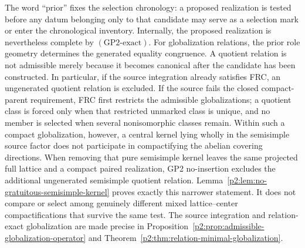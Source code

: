 \documentclass[12pt,a4paper]{article}
\begin{document}
\begin{mdframed}[style=postulatebox,nobreak=false]
\begin{postulate}
The word ``prior'' fixes the selection chronology: a proposed realization is
tested before any datum belonging only to that candidate may serve as a
selection mark or enter the chronological inventory.  Internally, the proposed
realization is nevertheless complete by \((\mathrm{GP2\text{-}exact})\).  For
globalization relations, the prior role geometry determines the generated
equality congruence.  A quotient
relation is not admissible merely because it becomes canonical after the
candidate has been constructed.  In particular, if the source integration
already satisfies FRC, an ungenerated quotient relation is excluded.  If the
source fails the closed compact-parent requirement, FRC first restricts the
admissible globalizations; a quotient class is forced only when that
restricted unmarked class is unique, and no member is selected when several
nonisomorphic classes remain.  Within such a compact globalization, however,
a central kernel lying wholly in the semisimple source factor does not
participate in compactifying the abelian covering directions.  When removing
that pure semisimple kernel leaves the same projected full lattice and a
compact paired realization, GP2 no-insertion excludes the additional
ungenerated semisimple quotient relation.  Lemma~\ref{p2:lem:no-gratuitous-semisimple-kernel}
proves exactly this narrower statement.  It does not compare or select among
genuinely different mixed lattice--center compactifications that survive the
same test.  The source integration and relation-exact globalization are made
precise in Proposition~\ref{p2:prop:admissible-globalization-operator} and
Theorem~\ref{p2:thm:relation-minimal-globalization}.


\end{postulate}
\end{mdframed}
\end{document}

